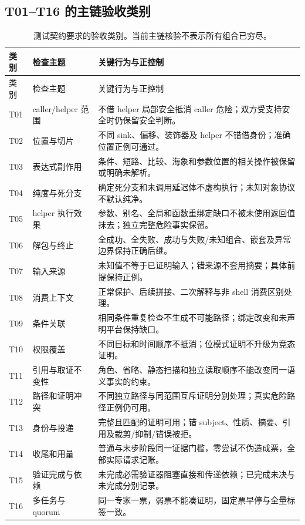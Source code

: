 \documentclass[UTF8,a4paper,zihao=-4,fontset=none]{ctexart}
\begin{document}
\subsection{T01--T16 的主链验收类别}
\begin{longtable}{L{13mm}L{46mm}L{90mm}}
\caption{测试契约要求的验收类别。当前主链核验不表示所有组合已穷尽。}\label{tab:acceptance}\\
\toprule 类别 & 检查主题 & 关键行为与正控制\\\midrule\endfirsthead
\toprule 类别 & 检查主题 & 关键行为与正控制\\\midrule\endhead
T01 & caller/helper 范围 & 不借 helper 局部安全抵消 caller 危险；双方受支持安全时仍保留安全判断。\\
T02 & 位置与切片 & 不同 sink、偏移、装饰器及 helper 不错借身份；准确位置正例可通过。\\
T03 & 表达式副作用 & 条件、短路、比较、海象和参数位置的相关操作被保留或明确未解析。\\
T04 & 纯度与死分支 & 确定死分支和未调用延迟体不虚构执行；未知对象协议不默认纯净。\\
T05 & helper 执行效果 & 参数、别名、全局和函数重绑定缺口不被未使用返回值抹去；独立完整危险事实保留。\\
T06 & 解包与终止 & 全成功、全失败、成功与失败/未知组合、嵌套及异常边界保持正确后继。\\
T07 & 输入来源 & 未知值不等于已证明输入；错来源不套用摘要；具体前提保持正例。\\
T08 & 消费上下文 & 正常保护、后续拼接、二次解释与非 shell 消费区别处理。\\
T09 & 条件关联 & 相同条件重复检查不生成不可能路径；绑定改变和未声明平台保持缺口。\\
T10 & 权限覆盖 & 不同目标和时间顺序不抵消；位模式证明不升级为竞态证明。\\
T11 & 引用与取证不变性 & 角色、省略、静态扫描和独立读取顺序不能改变同一语义事实的约束。\\
T12 & 路径和证明冲突 & 不同独立路径与同范围互斥证明分别处理；真实危险路径正例仍可用。\\
T13 & 身份与投递 & 完整且匹配的证明可用；错 subject、性质、摘要、引用及裁剪/抑制/错误被拒。\\
T14 & 收尾和用量 & 普通与末步阶段同一证据门槛，零尝试不伪造成票，全部实际请求记账。\\
T15 & 验证完成与依赖 & 未完成必需验证器阻塞直接和传递依赖；已完成未决与未完成分别记录。\\
T16 & 多任务与 quorum & 同一专家一票，弱票不能凑证明，固定票早停与全量标签一致。\\
\bottomrule
\end{longtable}
\cite{contract}
\end{document}
